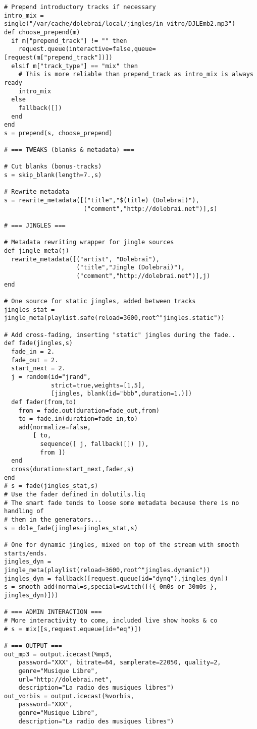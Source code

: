 \begin{verbatim}
# Prepend introductory tracks if necessary
intro_mix = single("/var/cache/dolebrai/local/jingles/in_vitro/DJLEmb2.mp3")
def choose_prepend(m)
  if m["prepend_track"] != "" then
    request.queue(interactive=false,queue=[request(m["prepend_track"])])
  elsif m["track_type"] == "mix" then
    # This is more reliable than prepend_track as intro_mix is always ready
    intro_mix
  else
    fallback([])
  end
end
s = prepend(s, choose_prepend)

# === TWEAKS (blanks & metadata) ===

# Cut blanks (bonus-tracks)
s = skip_blank(length=7.,s)

# Rewrite metadata
s = rewrite_metadata([("title","$(title) (Dolebrai)"),
                      ("comment","http://dolebrai.net")],s)

# === JINGLES ===

# Metadata rewriting wrapper for jingle sources
def jingle_meta(j)
  rewrite_metadata([("artist", "Dolebrai"),
                    ("title","Jingle (Dolebrai)"),
                    ("comment","http://dolebrai.net")],j)
end

# One source for static jingles, added between tracks
jingles_stat = jingle_meta(playlist.safe(reload=3600,root^"jingles.static"))

# Add cross-fading, inserting "static" jingles during the fade..
def fade(jingles,s)
  fade_in = 2.
  fade_out = 2.
  start_next = 2.
  j = random(id="jrand",
             strict=true,weights=[1,5],
             [jingles, blank(id="bbb",duration=1.)])
  def fader(from,to)
    from = fade.out(duration=fade_out,from)
    to = fade.in(duration=fade_in,to)
    add(normalize=false,
        [ to,
          sequence([ j, fallback([]) ]),
          from ])
  end
  cross(duration=start_next,fader,s)
end
# s = fade(jingles_stat,s)
# Use the fader defined in dolutils.liq
# The smart fade tends to loose some metadata because there is no handling of 
# them in the generators...
s = dole_fade(jingles=jingles_stat,s)

# One for dynamic jingles, mixed on top of the stream with smooth starts/ends.
jingles_dyn = jingle_meta(playlist(reload=3600,root^"jingles.dynamic"))
jingles_dyn = fallback([request.queue(id="dynq"),jingles_dyn])
s = smooth_add(normal=s,special=switch([({ 0m0s or 30m0s }, jingles_dyn)]))

# === ADMIN INTERACTION ===
# More interactivity to come, included live show hooks & co
# s = mix([s,request.equeue(id="eq")])

# === OUTPUT ===
out_mp3 = output.icecast(%mp3, 
    password="XXX", bitrate=64, samplerate=22050, quality=2,
    genre="Musique Libre",
    url="http://dolebrai.net",
    description="La radio des musiques libres")
out_vorbis = output.icecast(%vorbis, 
    password="XXX",
    genre="Musique Libre",
    description="La radio des musiques libres")


\end{verbatim}
